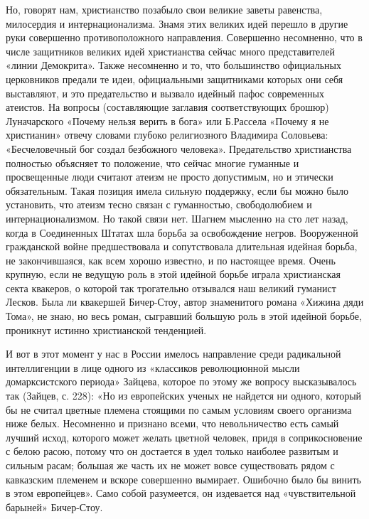 Но, говорят нам, христианство позабыло свои великие заветы равенства,
милосердия и интернационализма. Знамя этих великих идей перешло в
другие руки совершенно противоположного направления. Совершенно
несомненно, что в числе защитников великих идей христианства сейчас
много представителей «линии Демокрита». Также несомненно и то, что
большинство официальных церковников предали те идеи, официальными
защитниками которых они себя выставляют, и это предательство и вызвало
идейный пафос современных атеистов. На вопросы (составляющие заглавия
соответствующих брошюр) Луначарского «Почему нельзя верить в бога» или
Б.Рассела «Почему я не христианин» отвечу словами глубоко религиозного
Владимира Соловьева: «Бесчеловечный бог создал безбожного человека».
Предательство христианства полностью объясняет то положение, что
сейчас многие гуманные и просвещенные люди считают атеизм не просто
допустимым, но и этически обязательным. Такая позиция имела сильную
поддержку, если бы можно было установить, что атеизм тесно связан с
гуманностью, свободолюбием и интернационализмом. Но такой связи нет.
Шагнем мысленно на сто лет назад, когда в Соединенных Штатах шла
борьба за освобождение негров. Вооруженной гражданской войне
предшествовала и сопутствовала длительная идейная борьба, не
закончившаяся, как всем хорошо известно, и по настоящее время. Очень
крупную, если не ведущую роль в этой идейной борьбе играла
христианская секта квакеров, о которой так трогательно отзывался наш
великий гуманист Лесков. Была ли квакершей Бичер-Стоу, автор
знаменитого романа «Хижина дяди Тома», не знаю, но весь роман,
сыгравший большую роль в этой идейной борьбе, проникнут истинно
христианской тенденцией.

И вот в этот момент у нас в России имелось направление среди
радикальной интеллигенции в лице одного из «классиков революционной
мысли домарксистского периода» Зайцева, которое по этому же вопросу
высказывалось так (Зайцев, с. 228): «Но из европейских ученых не
найдется ни одного, который бы не считал цветные племена стоящими по
самым условиям своего организма ниже белых. Несомненно и признано
всеми, что невольничество есть самый лучший исход, которого может
желать цветной человек, придя в соприкосновение с белою расою, потому
что он достается в удел только наиболее развитым и сильным расам;
большая же часть их не может вовсе существовать рядом с кавказским
племенем и вскоре совершенно вымирает. Ошибочно было бы винить в этом
европейцев». Само собой разумеется, он издевается над «чувствительной
барыней» Бичер-Стоу.

